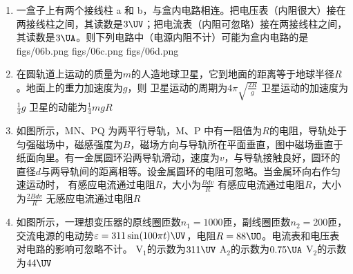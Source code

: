 \documentclass[\gkver]{gaokaozhenti}
\begin{document}
\begin{enumerate}
\item
一盒子上有两个接线柱 a 和 b，与盒内电路相连。把电压表（内阻很大）接在两接线柱之间，其读数是$3\UV$；把电流表（内阻可忽略）接在两接线柱之间，其读数是$3\UA$。则下列电路中（电源内阻不计）可能为盒内电路的是
{figs/06b.png}
{figs/06c.png}
{figs/06d.png}

\item
在圆轨道上运动的质量为$m$的人造地球卫星，它到地面的距离等于地球半径$R$。地面上的重力加速度为$g$，则
{卫星运动的周期为$4\pi\sqrt{\frac{2R}{g}}$}
{卫星运动的加速度为$\frac{1}{4}g$}
{卫星的动能为$\frac{1}{4}mgR$}

\item
如图所示，MN、PQ 为两平行导轨，M、P 中有一阻值为$R$的电阻，导轨处于匀强磁场中，磁感强度为$B$，磁场方向与导轨所在平面垂直，图中磁场垂直于纸面向里。有一金属圆环沿两导轨滑动，速度为$v$，与导轨接触良好，圆环的直径$d$与两导轨间的距离相等。设金属圆环的电阻可忽略。当金属环向右作匀速运动时，
{有感应电流通过电阻$R$，大小为$\frac{Bdv}{R}$}
{有感应电流通过电阻$R$，大小为$\frac{2Bdv}{R}$}
{无感应电流通过电阻$R$}

\item
如图所示，一理想变压器的原线圈匝数$n_{1}=1000$匝，副线圈匝数$n_{2}=200$匝，交流电源的电动势$\varepsilon=311\sin(100\pi t)\UV$，电阻$R=88\UO$。电流表和电压表对电路的影响可忽略不计。
{V$_{1}$的示数为$311\UV$}
{A$_{2}$的示数为$0.75\UA$}
{V$_{2}$的示数为$44\UV$}


\end{enumerate}
\end{document}
